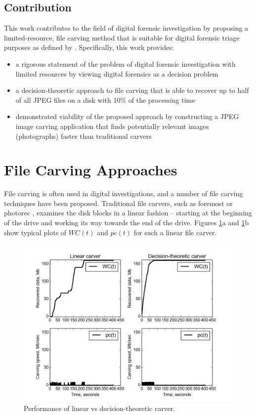 \documentclass[10pt,a4paper]{article}
\begin{document}
\subsection{Contribution}
This work contributes to the field of digital forensic investigation by proposing a limited-resource, file carving method that is suitable for digital forensic triage purposes as defined by \cite{Koopmans2013}. Specifically, this work provides:
\begin{itemize}
	\item{a rigorous statement of the problem of digital forensic investigation with limited resources by viewing digital forensics as a decision problem}
	\item{a decision-theoretic approach to file carving that is able to recover up to half of all JPEG files on a disk with 10\% of the processing time}
	\item{demonstrated viability of the proposed approach by constructing a JPEG image carving application that finds potentially relevant images (photographs) faster than traditional carvers}
\end{itemize}

\section{File Carving Approaches}
File carving is often used in digital investigations, and a number of file carving techniques have been proposed. Traditional file carvers, such as foremost \cite{richard2005scalpel} or photorec \cite{grenier2007photorec}, examines the disk blocks in a linear fashion -- starting at the beginning of the drive and working its way towards the end of the drive. Figures \ref{fig:linear_vs_deca}a and \ref{fig:linear_vs_deca}b show typical plots of $WC(t)$ and $pc(t)$ for such a linear file carver. 

\begin{figure}
	\includegraphics[width=\textwidth]{fig1}
	\caption{Performance of linear vs decision-theoretic carver.}
	\label{fig:linear_vs_deca}
\end{figure}
\end{document}

